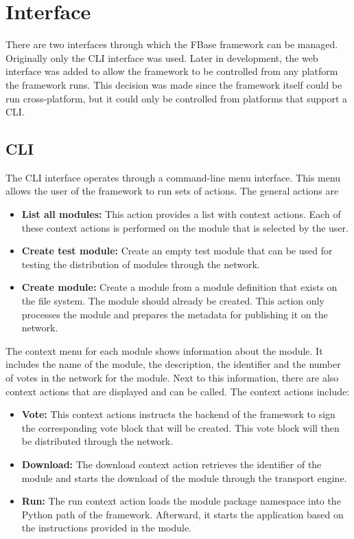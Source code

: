 \section{Interface}

There are two interfaces through which the FBase framework can be managed. Originally only the CLI interface was used. Later in development, the web interface was added to allow the framework to be controlled from any platform the framework runs. This decision was made since the framework itself could be run cross-platform, but it could only be controlled from platforms that support a CLI.

\subsection{CLI}
The CLI interface operates through a command-line menu interface. This menu allows the user of the framework to run sets of actions. The general actions are

\begin{itemize}
	\item \textbf{List all modules:} This action provides a list with context actions. Each of these context actions is performed on the module that is selected by the user.
	\item \textbf{Create test module:} Create an empty test module that can be used for testing the distribution of modules through the network.
	\item \textbf{Create module:} Create a module from a module definition that exists on the file system. The module should already be created. This action only processes the module and prepares the metadata for publishing it on the network.
\end{itemize}

The context menu for each module shows information about the module. It includes the name of the module, the description, the identifier and the number of votes in the network for the module. Next to this information, there are also context actions that are displayed and can be called. The context actions include:

\begin{itemize}
	\item \textbf{Vote:} This context actions instructs the backend of the framework to sign the corresponding vote block that will be created. This vote block will then be distributed through the network.
	\item \textbf{Download:} The download context action retrieves the identifier of the module and starts the download of the module through the transport engine.
	\item \textbf{Run:} The run context action loads the module package namespace into the Python path of the framework. Afterward, it starts the application based on the instructions provided in the module.
\end{itemize}

